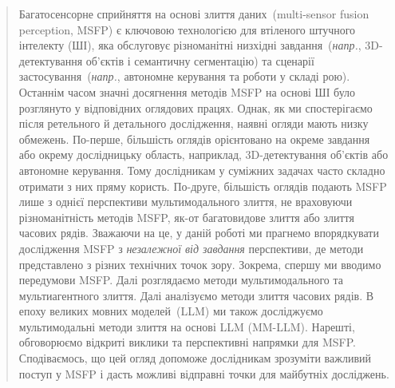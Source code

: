 \begin{abstract}

Багатосенсорне сприйняття на основі злиття даних~(multi-sensor fusion perception, MSFP) є ключовою технологією для втіленого штучного інтелекту (ШІ), яка обслуговує різноманітні низхідні завдання~(\textit{напр.}, 3D-детектування об'єктів і семантичну сегментацію) та сценарії застосування~(\textit{напр.}, автономне керування та роботи у складі рою).
Останнім часом значні досягнення методів MSFP на основі ШІ було розглянуто у відповідних оглядових працях.
Однак, як ми спостерігаємо після ретельного й детального дослідження, наявні огляди мають низку обмежень.
По-перше, більшість оглядів орієнтовано на окреме завдання або окрему дослідницьку область, наприклад, 3D-детектування об'єктів або автономне керування. Тому дослідникам у суміжних задачах часто складно отримати з них пряму користь.
По-друге, більшість оглядів подають MSFP лише з однієї перспективи мультимодального злиття, не враховуючи різноманітність методів MSFP, як-от багатовидове злиття або злиття часових рядів.
Зважаючи на це, у даній роботі ми прагнемо впорядкувати дослідження MSFP з \emph{не\-залежної від завдання} перспективи, де методи представлено з різних технічних точок зору.
Зокрема, спершу ми вводимо передумови MSFP. Далі розглядаємо методи мультимодального та мульти\-агент\-ного злиття. Далі аналізуємо методи злиття часових рядів. В епоху великих мовних моделей~(LLM) ми також досліджуємо мультимодальні методи злиття на основі LLM (MM-LLM). Нарешті, обговорюємо відкриті виклики та перспективні напрямки для MSFP.
Сподіваємось, що цей огляд допоможе дослідникам зрозуміти важливий поступ у MSFP і дасть можливі відправні точки для майбутніх досліджень.
\end{abstract}

